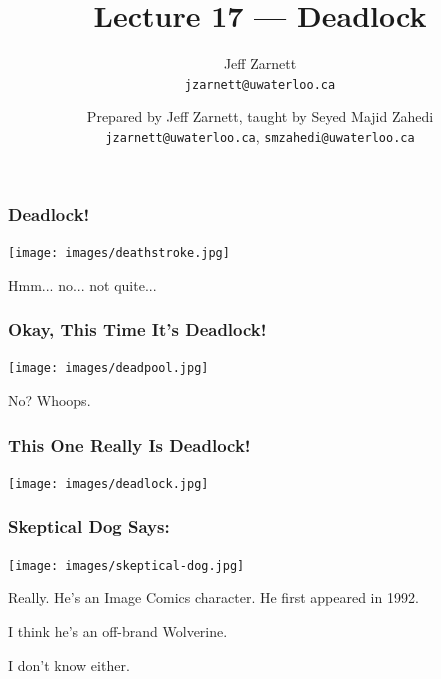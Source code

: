 

\title{Lecture 17 --- Deadlock }

\author{Jeff Zarnett \\ \small \texttt{jzarnett@uwaterloo.ca}}
\author{Prepared by Jeff Zarnett, taught by Seyed Majid Zahedi \\ \small \texttt{jzarnett@uwaterloo.ca}, \texttt{smzahedi@uwaterloo.ca}}
\date{}




\begin{frame}
	\titlepage

\end{frame}


\begin{frame}
	\frametitle{Deadlock!}

	\begin{center}
		\texttt{[image: images/deathstroke.jpg]}
	\end{center}

	Hmm... no... not quite...

\end{frame}


\begin{frame}
	\frametitle{Okay, This Time It's Deadlock!}

	\begin{center}
		\texttt{[image: images/deadpool.jpg]}
	\end{center}

	No? Whoops.

\end{frame}


\begin{frame}
	\frametitle{This One Really Is Deadlock!}

	\begin{center}
		\texttt{[image: images/deadlock.jpg]}
	\end{center}

\end{frame}

\begin{frame}
	\frametitle{Skeptical Dog Says:}

	\begin{center}
		\texttt{[image: images/skeptical-dog.jpg]}
	\end{center}

	Really. He's an Image Comics character. He first appeared in 1992.

	I think he's an off-brand Wolverine.

	I don't know either.


\end{frame}


